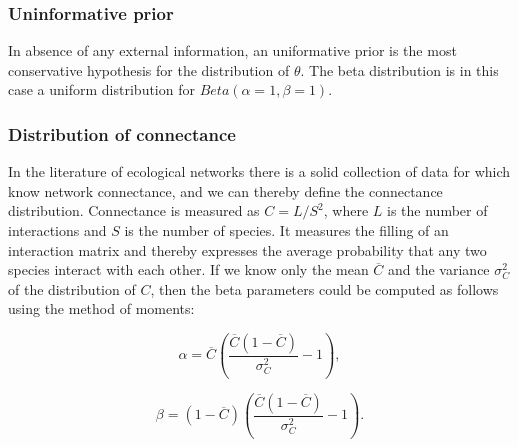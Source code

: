 \documentclass[12pt]{article}
\begin{document}
    \subsubsection*{Uninformative prior}
      
      In absence of any external information, an uniformative prior is the most conservative 
      hypothesis for the distribution of $\theta$. The beta distribution is in this case 
      a uniform distribution  for $Beta(\alpha=1,\beta=1)$. 

    \subsubsection*{Distribution of connectance}
      
      In the literature of ecological networks there is a solid collection of data for which know network connectance, and we can thereby define the connectance distribution. Connectance is measured as $C = L/S^2$, where $L$ is the number of interactions and $S$ is the number of species. It measures the filling of an interaction matrix and thereby expresses the average probability that any two species interact with each other. If we know only the mean $\overline{C}$ and the variance $\sigma_C^2$ of the distribution of $C$, then the beta parameters could be computed as follows using the method of moments:

  \begin{equation}
    \alpha = \overline{C}(\frac{\overline{C}(1-\overline{C})}{\sigma_C^2}-1) ,
  \end{equation}

  \begin{equation}
    \beta = (1-\overline{C})(\frac{\overline{C}(1-\overline{C})}{\sigma_C^2}-1) .
  \end{equation}
  
%  
%
%
%
\end{document}
